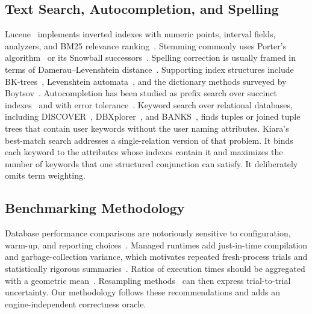 \subsection{Text Search, Autocompletion, and Spelling}
Lucene~\cite{mccandless2010lucene} implements inverted indexes with numeric points, interval fields, analyzers, and BM25 relevance ranking~\cite{robertson2009bm25}. Stemming commonly uses Porter's algorithm~\cite{porter1980algorithm} or its Snowball successors~\cite{porter2001snowball}. Spelling correction is usually framed in terms of Damerau--Levenshtein distance~\cite{damerau1964technique,levenshtein1966binary}. Supporting index structures include BK-trees~\cite{burkhard1973approaches}, Levenshtein automata~\cite{schulz2002fast}, and the dictionary methods surveyed by Boytsov~\cite{boytsov2011indexing}. Autocompletion has been studied as prefix search over succinct indexes~\cite{bast2006type} and with error tolerance~\cite{ji2009efficient}. Keyword search over relational databases, including DISCOVER~\cite{hristidis2002discover}, DBXplorer~\cite{agrawal2002dbxplorer}, and BANKS~\cite{bhalotia2002banks}, finds tuples or joined tuple trees that contain user keywords without the user naming attributes. Kiara's best-match search addresses a single-relation version of that problem. It binds each keyword to the attributes whose indexes contain it and maximizes the number of keywords that one structured conjunction can satisfy. It deliberately omits term weighting.

\subsection{Benchmarking Methodology}
Database performance comparisons are notoriously sensitive to configuration, warm-up, and reporting choices~\cite{raasveldt2018fair}. Managed runtimes add just-in-time compilation and garbage-collection variance, which motivates repeated fresh-process trials and statistically rigorous summaries~\cite{georges2007statistically}. Ratios of execution times should be aggregated with a geometric mean~\cite{fleming1986how}. Resampling methods~\cite{efron1993introduction} can then express trial-to-trial uncertainty. Our methodology follows these recommendations and adds an engine-independent correctness oracle.

